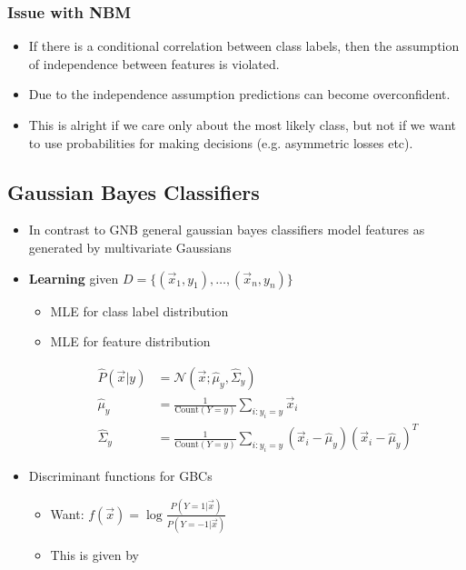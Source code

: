 \documentclass[10pt,a4paper]{scrartcl}
\begin{document}
\begin{multicols*}{2}
\subsubsection{Issue with NBM}

\begin{itemize}
\item If there is a conditional correlation between class labels, then the assumption of independence between features is violated.
\item Due to the independence assumption predictions can become overconfident.
\item This is alright if we care only about the most likely class, but not if we want to use probabilities for making decisions (e.g. asymmetric losses etc).
\end{itemize}

\subsection{Gaussian Bayes Classifiers}

\begin{itemize}
\item In contrast to GNB general gaussian bayes classifiers model features as generated by multivariate Gaussians

\item \textbf{Learning} given $D=\{(\vec{x}_1,y_1),\ldots,(\vec{x}_n,y_n)\}$
\begin{itemize}
\item MLE for class label distribution

\item MLE for feature distribution

\begin{align*}
\hat{P}(\vec{x}|y)&=\mathcal{N}(\vec{x};\hat{\mu}_y,\hat{\Sigma}_y)\\
\hat{\mu}_y&=\frac{1}{\text{Count}(Y=y)}\sum\limits_{i:y_i=y}\vec{x}_i\\
\hat{\Sigma}_y&=\frac{1}{\text{Count}(Y=y)}\sum\limits_{i:y_i=y}(\vec{x}_i-\hat{\mu}_y)(\vec{x}_i-\hat{\mu}_y)^T
\end{align*}
\end{itemize}
\item Discriminant functions for GBCs
\begin{itemize}
\item Want: $f(\vec{x})=\log\frac{P(Y=1|\vec{x})}{P(Y=-1|\vec{x})}$
\item This is given by


\end{itemize}
\end{itemize}
\end{multicols*}
\end{document}
